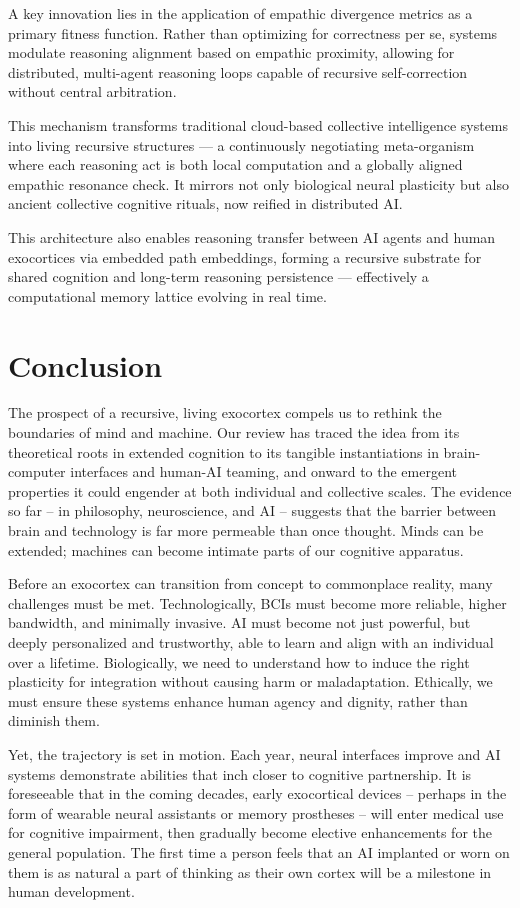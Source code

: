 \documentclass[11pt]{article}
\begin{document}
A key innovation lies in the application of empathic divergence metrics as a primary fitness function. Rather than optimizing for correctness per se, systems modulate reasoning alignment based on empathic proximity, allowing for distributed, multi-agent reasoning loops capable of recursive self-correction without central arbitration.

This mechanism transforms traditional cloud-based collective intelligence systems into living recursive structures — a continuously negotiating meta-organism where each reasoning act is both local computation and a globally aligned empathic resonance check. It mirrors not only biological neural plasticity but also ancient collective cognitive rituals, now reified in distributed AI.

This architecture also enables reasoning transfer between AI agents and human exocortices via embedded path embeddings, forming a recursive substrate for shared cognition and long-term reasoning persistence — effectively a computational memory lattice evolving in real time.

\section{Conclusion}
The prospect of a recursive, living exocortex compels us to rethink the boundaries of mind and machine. Our review has traced the idea from its theoretical roots in extended cognition to its tangible instantiations in brain-computer interfaces and human-AI teaming, and onward to the emergent properties it could engender at both individual and collective scales. The evidence so far -- in philosophy, neuroscience, and AI -- suggests that the barrier between brain and technology is far more permeable than once thought. Minds can be extended; machines can become intimate parts of our cognitive apparatus.

Before an exocortex can transition from concept to commonplace reality, many challenges must be met. Technologically, BCIs must become more reliable, higher bandwidth, and minimally invasive. AI must become not just powerful, but deeply personalized and trustworthy, able to learn and align with an individual over a lifetime. Biologically, we need to understand how to induce the right plasticity for integration without causing harm or maladaptation. Ethically, we must ensure these systems enhance human agency and dignity, rather than diminish them.

Yet, the trajectory is set in motion. Each year, neural interfaces improve and AI systems demonstrate abilities that inch closer to cognitive partnership. It is foreseeable that in the coming decades, early exocortical devices -- perhaps in the form of wearable neural assistants or memory prostheses -- will enter medical use for cognitive impairment, then gradually become elective enhancements for the general population. The first time a person feels that an AI implanted or worn on them is as natural a part of thinking as their own cortex will be a milestone in human development.
\end{document}
